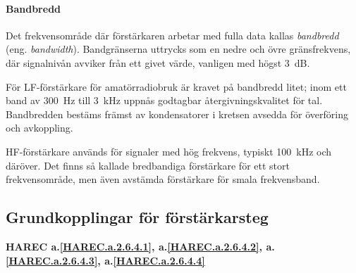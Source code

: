 \paragraph{Bandbredd}

Det frekvensområde där förstärkaren arbetar med fulla data kallas
\emph{bandbredd} (eng. \emph{bandwidth}).
Bandgränserna uttrycks som en nedre och övre gränsfrekvens, där signalnivån
avviker från ett givet värde, vanligen med högst 3~dB.

För LF-förstärkare för amatörradiobruk är kravet på bandbredd litet; inom ett
band av 300~Hz till 3~kHz uppnås godtagbar återgivningskvalitet för tal.
Bandbredden bestäms främst av kondensatorer i kretsen avsedda för överföring
och avkoppling.

HF-förstärkare används för signaler med hög frekvens, typiskt 100~kHz och
däröver.
Det finns så kallade bredbandiga förstärkare för ett stort frekvensområde, men
även avstämda förstärkare för smala frekvensband.

\subsection{Grundkopplingar för förstärkarsteg}
\textbf{HAREC a.\ref{HAREC.a.2.6.4.1}, a.\ref{HAREC.a.2.6.4.2}, a.\ref{HAREC.a.2.6.4.3}, a.\ref{HAREC.a.2.6.4.4}\label{myHAREC.a.2.6.4.1}\label{myHAREC.a.2.6.4.2}\label{myHAREC.a.2.6.4.3}\label{myHAREC.a.2.6.4.4}}

